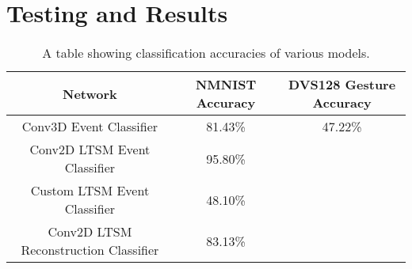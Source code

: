 \chapter{Testing and Results} \label{chap:testing_and_results}

\begin{table}[htb]
    \centering
    \begin{tabular}{|| c  | c | c ||}
        \hline
        Network     & NMNIST Accuracy & DVS128 Gesture Accuracy \\
        \hline \hline
        Conv3D Event Classifier          & 81.43\%   &   \color{red} 47.22\% \color{black}    \\
        \hline
        Conv2D LTSM Event Classifier         & 95.80\%   &        \\
        \hline
        Custom LTSM Event Classifier         & \color{red} 48.10\% \color{black}   &        \\
        \hline
        Conv2D LTSM Reconstruction Classifier           & \color{red} 83.13\% \color{black}    &       \\
        \hline
    \end{tabular}
    \caption{A table showing classification accuracies of various models.}
    \label{tab:network_performances}
\end{table}